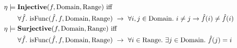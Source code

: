 \begin{align*}
  &\env \models \inject(f, \mathrm{Domain}, \mathrm{Range}) \ \mathrm{iff} \\
  &\qquad \forall \hat{f}. \ \mathrm{isFunc}(\hat{f}, f, \mathrm{Domain}, \mathrm{Range}) \ \rightarrow
   \ \forall i,j \in \mathrm{Domain}. \ i \neq j \rightarrow \hat{f}(i) \neq \hat{f}(i) \\
  &\env \models \surject(f, \mathrm{Domain}, \mathrm{Range}) \ \mathrm{iff} \\
  &\qquad \forall \hat{f}. \ \mathrm{isFunc}(\hat{f}, f, \mathrm{Domain}, \mathrm{Range}) \ \rightarrow
   \ \forall i \in \mathrm{Range}. \ \exists j \in \mathrm{Domain}. \ \hat{f}(j) = i
\end{align*}


